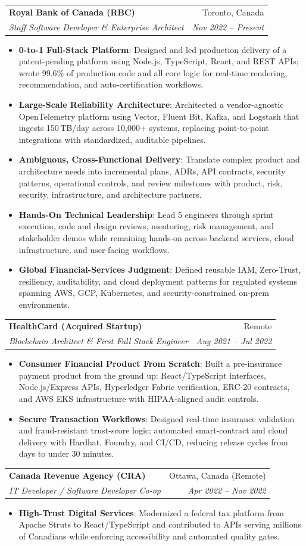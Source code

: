 \documentclass[letterpaper,9.5pt]{article}
\makeatletter
\newcommand{\resumeItem}[2]{\item\small{\textbf{#1}{: #2 \vspace{-2pt}}}}
\newcommand{\resumeSubheading}[4]{\vspace{-2pt}\item\begin{tabular*}{0.97\textwidth}{l@{\extracolsep{\fill}}r}\textbf{#1} & #2 \\\textit{\small#3} & \textit{\small #4} \\\end{tabular*}\vspace{-6pt}}
\newcommand{\resumeItemListStart}{\begin{itemize}}
\newcommand{\resumeItemListEnd}{\end{itemize}\vspace{-6pt}}
\makeatother
\begin{document}
  \resumeSubheading
    {Royal Bank of Canada (RBC)}{Toronto, Canada}
    {Staff Software Developer \& Enterprise Architect}{Nov 2022 -- Present}
  \resumeItemListStart
    \resumeItem{0-to-1 Full-Stack Platform}
      {Designed and led production delivery of a patent-pending platform using Node.js, TypeScript, React, and REST APIs; wrote 99.6\% of production code and all core logic for real-time rendering, recommendation, and auto-certification workflows.}
    \resumeItem{Large-Scale Reliability Architecture}
      {Architected a vendor-agnostic OpenTelemetry platform using Vector, Fluent Bit, Kafka, and Logstash that ingests 150\,TB/day across 10,000+ systems, replacing point-to-point integrations with standardized, auditable pipelines.}
    \resumeItem{Ambiguous, Cross-Functional Delivery}
      {Translate complex product and architecture needs into incremental plans, ADRs, API contracts, security patterns, operational controls, and review milestones with product, risk, security, infrastructure, and architecture partners.}
    \resumeItem{Hands-On Technical Leadership}
      {Lead 5 engineers through sprint execution, code and design reviews, mentoring, risk management, and stakeholder demos while remaining hands-on across backend services, cloud infrastructure, and user-facing workflows.}
    \resumeItem{Global Financial-Services Judgment}
      {Defined reusable IAM, Zero-Trust, resiliency, auditability, and cloud deployment patterns for regulated systems spanning AWS, GCP, Kubernetes, and security-constrained on-prem environments.}
  \resumeItemListEnd

  \resumeSubheading
    {HealthCard (Acquired Startup)}{Remote}
    {Blockchain Architect \& First Full Stack Engineer}{Aug 2021 -- Jul 2022}
  \resumeItemListStart
    \resumeItem{Consumer Financial Product From Scratch}
      {Built a pre-insurance payment product from the ground up: React/TypeScript interfaces, Node.js/Express APIs, Hyperledger Fabric verification, ERC-20 contracts, and AWS EKS infrastructure with HIPAA-aligned audit controls.}
    \resumeItem{Secure Transaction Workflows}
      {Designed real-time insurance validation and fraud-resistant trust-score logic; automated smart-contract and cloud delivery with Hardhat, Foundry, and CI/CD, reducing release cycles from days to under 30 minutes.}
  \resumeItemListEnd

  \resumeSubheading
    {Canada Revenue Agency (CRA)}{Ottawa, Canada (Remote)}
    {IT Developer / Software Developer Co-op}{Apr 2022 -- Nov 2022}
  \resumeItemListStart
    \resumeItem{High-Trust Digital Services}
      {Modernized a federal tax platform from Apache Struts to React/TypeScript and contributed to APIs serving millions of Canadians while enforcing accessibility and automated quality gates.}
  \resumeItemListEnd
\end{document}
